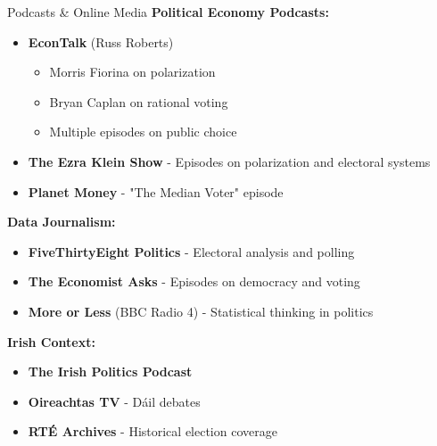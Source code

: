 \documentclass[10pt]{beamer}
\begin{document}
\begin{frame}[allowframebreaks]{Podcasts \& Online Media}
\textbf{Political Economy Podcasts:}
\begin{itemize}
\item \textbf{EconTalk} (Russ Roberts)
\begin{itemize}
\item Morris Fiorina on polarization
\item Bryan Caplan on rational voting
\item Multiple episodes on public choice
\end{itemize}
\item \textbf{The Ezra Klein Show} - Episodes on polarization and electoral systems
\item \textbf{Planet Money} - "The Median Voter" episode
\end{itemize}

   \framebreak 
\textbf{Data Journalism:}
\begin{itemize}
\item \textbf{FiveThirtyEight Politics} - Electoral analysis and polling
\item \textbf{The Economist Asks} - Episodes on democracy and voting
\item \textbf{More or Less} (BBC Radio 4) - Statistical thinking in politics
\end{itemize}


\textbf{Irish Context:}
\begin{itemize}
\item \textbf{The Irish Politics Podcast}
\item \textbf{Oireachtas TV} - Dáil debates
\item \textbf{RTÉ Archives} - Historical election coverage
\end{itemize}
\end{frame}
\end{document}
